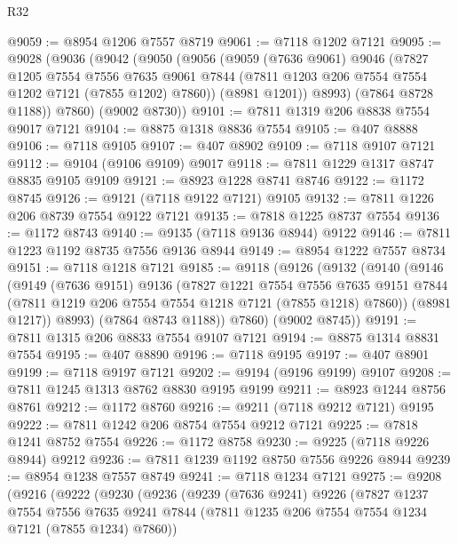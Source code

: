 \begin{lexlean}{R32}
\begin{coremodule}
@9059 := @8954 @1206 @7557 @8719
@9061 := @7118 @1202 @7121
@9095 := @9028
    (@9036
      (@9042
        (@9050
          (@9056
            (@9059
              (@7636 @9061)
              @9046
              (@7827
                @1205
                @7554
                @7556
                @7635
                @9061
                @7844
                (@7811 @1203 @206 @7554 @7554 @1202 @7121 (@7855 @1202) @7860))
              (@8981 @1201))
            @8993)
          (@7864 @8728 @1188))
        @7860)
      (@9002 @8730))
@9101 := @7811 @1319 @206 @8838 @7554 @9017 @7121
@9104 := @8875 @1318 @8836 @7554
@9105 := @407 @8888
@9106 := @7118 @9105
@9107 := @407 @8902
@9109 := @7118 @9107 @7121
@9112 := @9104 (@9106 @9109) @9017
@9118 := @7811 @1229 @1317 @8747 @8835 @9105 @9109
@9121 := @8923 @1228 @8741 @8746
@9122 := @1172 @8745
@9126 := @9121 (@7118 @9122 @7121) @9105
@9132 := @7811 @1226 @206 @8739 @7554 @9122 @7121
@9135 := @7818 @1225 @8737 @7554
@9136 := @1172 @8743
@9140 := @9135 (@7118 @9136 @8944) @9122
@9146 := @7811 @1223 @1192 @8735 @7556 @9136 @8944
@9149 := @8954 @1222 @7557 @8734
@9151 := @7118 @1218 @7121
@9185 := @9118
    (@9126
      (@9132
        (@9140
          (@9146
            (@9149
              (@7636 @9151)
              @9136
              (@7827
                @1221
                @7554
                @7556
                @7635
                @9151
                @7844
                (@7811 @1219 @206 @7554 @7554 @1218 @7121 (@7855 @1218) @7860))
              (@8981 @1217))
            @8993)
          (@7864 @8743 @1188))
        @7860)
      (@9002 @8745))
@9191 := @7811 @1315 @206 @8833 @7554 @9107 @7121
@9194 := @8875 @1314 @8831 @7554
@9195 := @407 @8890
@9196 := @7118 @9195
@9197 := @407 @8901
@9199 := @7118 @9197 @7121
@9202 := @9194 (@9196 @9199) @9107
@9208 := @7811 @1245 @1313 @8762 @8830 @9195 @9199
@9211 := @8923 @1244 @8756 @8761
@9212 := @1172 @8760
@9216 := @9211 (@7118 @9212 @7121) @9195
@9222 := @7811 @1242 @206 @8754 @7554 @9212 @7121
@9225 := @7818 @1241 @8752 @7554
@9226 := @1172 @8758
@9230 := @9225 (@7118 @9226 @8944) @9212
@9236 := @7811 @1239 @1192 @8750 @7556 @9226 @8944
@9239 := @8954 @1238 @7557 @8749
@9241 := @7118 @1234 @7121
@9275 := @9208
    (@9216
      (@9222
        (@9230
          (@9236
            (@9239
              (@7636 @9241)
              @9226
              (@7827
                @1237
                @7554
                @7556
                @7635
                @9241
                @7844
                (@7811 @1235 @206 @7554 @7554 @1234 @7121 (@7855 @1234) @7860))

\end{coremodule}
\end{lexlean}
